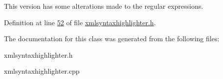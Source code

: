 \-This version has some alterations made to the regular expressions. 

\-Definition at line \hyperlink{xmlsyntaxhighlighter_8h_source_l00052}{52} of file \hyperlink{xmlsyntaxhighlighter_8h_source}{xmlsyntaxhighlighter.\-h}.



\-The documentation for this class was generated from the following files\-:\begin{DoxyCompactItemize}
\item 
xmlsyntaxhighlighter.\-h\item 
xmlsyntaxhighlighter.\-cpp\end{DoxyCompactItemize}
